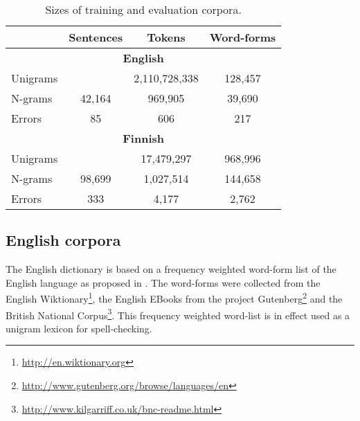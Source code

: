 \documentclass{llncs}
\begin{document}
\begin{table}
    \caption{Sizes of training and evaluation corpora.
    \label{table:corpora}}
  \begin{center}
      \begin{tabular}{lccc}
        \hline
         & Sentences & Tokens & Word-forms \\
        \hline
        \multicolumn{4}{c}{\textbf{English}} \\
        \hline
        Unigrams &  & 2,110,728,338 & 128,457  \\
        N-grams & 42,164 & 969,905 & 39,690 \\
        Errors  & 85 & 606 & 217 \\
        \hline
        \multicolumn{4}{c}{\textbf{Finnish}} \\
        \hline
        Unigrams &  & 17,479,297 & 968,996 \\
        N-grams & 98,699 & 1,027,514 & 144,658 \\
        Errors  & 333 & 4,177 & 2,762 \\
        \hline
      \end{tabular}
  \end{center}
\end{table}

\subsection{English corpora}

The English dictionary is based on a frequency weighted word-form list of
the English language as proposed in \cite{norvig/2010}. The word-forms were
collected from the English Wiktionary\footnote{\url{http://en.wiktionary.org}},
the English EBooks from the project
Gutenberg\footnote{\url{http://www.gutenberg.org/browse/languages/en}} and the
British National
Corpus\footnote{\url{http://www.kilgarriff.co.uk/bnc-readme.html}}. This
frequency weighted word-list is in effect used as a unigram lexicon for spell-checking.
\end{document}
